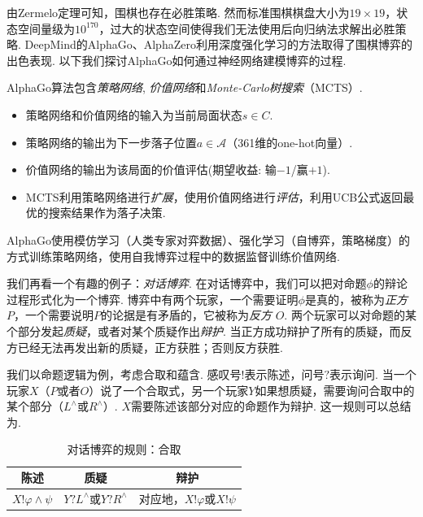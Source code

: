 由Zermelo定理可知，围棋也存在必胜策略. 然而标准围棋棋盘大小为$19\times 19$，状态空间量级为$10^{170}$，过大的状态空间使得我们无法使用后向归纳法求解出必胜策略. DeepMind的AlphaGo、AlphaZero利用深度强化学习的方法取得了围棋博弈的出色表现. 以下我们探讨AlphaGo如何通过神经网络建模博弈的过程.

AlphaGo算法包含\emph{策略网络}, \emph{价值网络}和\emph{Monte-Carlo树搜索}（MCTS）.
\begin{itemize}
    \item 策略网络和价值网络的输入为当前局面状态$s\in C$. 
    \item 策略网络的输出为下一步落子位置$a\in\mathcal A$（361维的one-hot向量）.
    \item 价值网络的输出为该局面的价值评估(期望收益: 输$-1$/赢$+1$).
    \item MCTS利用策略网络进行\emph{扩展}，使用价值网络进行\emph{评估}，利用UCB公式返回最优的搜索结果作为落子决策.
\end{itemize}

AlphaGo使用模仿学习（人类专家对弈数据）、强化学习（自博弈，策略梯度）的方式训练策略网络，使用自我博弈过程中的数据监督训练价值网络.


我们再看一个有趣的例子：\emph{对话博弈}. 在对话博弈中，我们可以把对命题$\phi$的辩论过程形式化为一个博弈. 博弈中有两个玩家，一个需要证明$\phi$是真的，被称为\emph{正方} $P$，一个需要说明$P$的论据是有矛盾的，它被称为\emph{反方} $O$. 两个玩家可以对命题的某个部分发起\emph{质疑}，或者对某个质疑作出\emph{辩护}. 当正方成功辩护了所有的质疑，而反方已经无法再发出新的质疑，正方获胜；否则反方获胜.

我们以命题逻辑为例，考虑合取和蕴含. 感叹号$!$表示陈述，问号$?$表示询问. 当一个玩家$X$（$P$或者$O$）说了一个合取式，另一个玩家$Y$如果想质疑，需要询问合取中的某个部分（$L^\wedge$或$R^\wedge$）. $X$需要陈述该部分对应的命题作为辩护. 这一规则可以总结为.
\begin{table}[ht]
    \centering
    \begin{tabular}{c|c|c}
         陈述&质疑&辩护  \\\hline
         $X!\varphi\wedge\psi$&$Y?L^\wedge$或$Y?R^\wedge$& 对应地，$X!\varphi$或$X!\psi$
    \end{tabular}
    \caption{对话博弈的规则：合取}
    \label{tab:dialogue-game-or}
\end{table}

